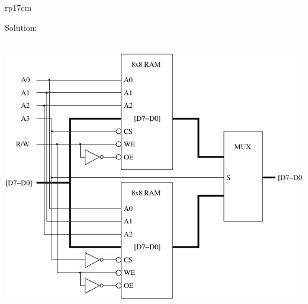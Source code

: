 \documentclass{article}
\begin{document}
\begin{longtable}[l]{rp{17cm}}
\begin{minipage}[t]{\linewidth}
Solution: \\ \\
\begin{center}
  \includegraphics{../Memory/Assessments/RAMMemory}
\end{center}
\end{minipage}\\
\medskip
\end{longtable}
\end{document}
